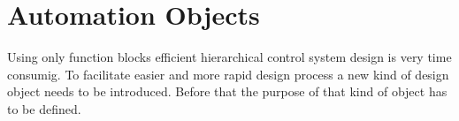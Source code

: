 \chapter{Automation Objects}
\label{automationobjects}


Using only function blocks efficient hierarchical control
system design is very time consumig. To facilitate easier
and more rapid design process a new kind of design object
needs to be introduced. Before that the purpose of that kind
of object has to be defined.







